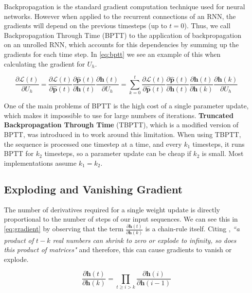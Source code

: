 Backpropagation is the standard gradient computation technique used for neural networks. However when applied to the recurrent connections of an RNN, the gradients will depend on the previous timesteps (up to $t=0$). Thus, we call Backpropagation Through Time (BPTT) \cite{werbos1990backpropagation} to the application of backpropagation on an unrolled RNN, which accounts for this dependencies by summing up the gradients for each time step. In \autoref{eq:bptt} we see an example of this when calculating the gradient for $U_h$.

\begin{equation} \label{eq:bptt}
	\frac{\partial \mathcal{L}(t)}{\partial U_h} = \frac{\partial \mathcal{L}(t)}{\partial \mathbf{\hat{p}}(t)}\frac{\partial \mathbf{\hat{p}}(t)}{\partial \mathbf{h}(t)}\frac{\partial \mathbf{h}(t)}{\partial U_h} = \sum_{k=0}^{t} \frac{\partial \mathcal{L}(t)}{\partial \mathbf{\hat{p}}(t)}\frac{\partial \mathbf{\hat{p}}(t)}{\partial \mathbf{h}(t)}\frac{\partial \mathbf{h}(t)}{\partial \mathbf{h}(k)}\frac{\partial \mathbf{h}(k)}{\partial U_h}
\end{equation}

One of the main problems of BPTT is the high cost of a single parameter update, which makes it impossible to use for large numbers of iterations. \textbf{Truncated Backpropagation Through Time} (TBPTT), which is a modified version of BPTT, was introduced in \cite{sutskever2013training} to work around this limitation. When using TBPTT, the sequence is processed one timestep at a time, and every $k_1$ timesteps, it runs BPTT for $k_2$ timesteps, so a parameter update can be cheap if $k_2$ is small. Most implementations assume $k_1=k_2$.

\subsection{Exploding and Vanishing Gradient}

The number of derivatives required for a single weight update is directly proportional to the number of steps of our input sequences. We can see this in \autoref{eq:gradient} by observing that the term $\frac{\partial \mathbf{h}(t)}{\partial \mathbf{h}(k)}$ is a chain-rule itself. Citing \cite{pascanu2013difficulty}, \textit{``a product of $t-k$ real numbers can shrink to zero or explode to infinity, so does this product of matrices"} and therefore, this can cause gradients to vanish or explode. 

\begin{equation} \label{eq:gradient}
	\frac{\partial \mathbf{h}(t)}{\partial \mathbf{h}(k)} = \prod_{t \geq i > k} \frac{\partial \mathbf{h}(i)}{\partial \mathbf{h}(i-1)}
\end{equation}

